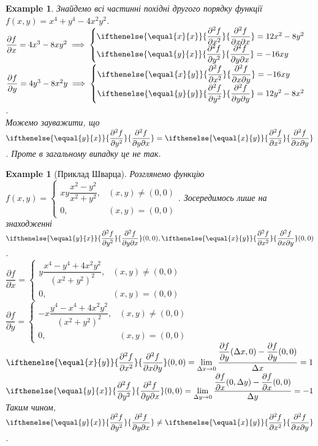 \documentclass[a4paper, 10pt]{article}
\def\departial#1#2{\dfrac{\partial {#1}}{\partial {#2}}}
\def\seconddepartial#1#2#3{\ifthenelse{\equal{#2}{#3}}{\dfrac{\partial^2 {#1}}{\partial {#2}^2}}{\dfrac{\partial^2 {#1}}{\partial {#2} \partial {#3}}}}
\def\huge{\displaystyle}
\theoremstyle{theoremdd}
\theoremstyle{theoremdd}
\theoremstyle{theoremdd}
\theoremstyle{theoremdd}
\theoremstyle{theoremdd}
\newtheorem{example}[theorem]{Example}
\theoremstyle{theoremdd}
\theoremstyle{theoremdd}
\theoremstyle{theoremdd}
\theoremstyle{theoremdd}
\begin{document}
\begin{example}
Знайдемо всі частинні похідні другого порядку функції $f(x,y) = x^4+y^4-4x^2y^2$.\\
$\departial{f}{x} = 4x^3 - 8xy^2 \implies \begin{cases} \seconddepartial{f}{x}{x} = 12x^2 - 8y^2 \\ \seconddepartial{f}{y}{x} = -16xy \end{cases}$ \hspace{1cm} $\departial{f}{y} = 4y^3 - 8x^2y \implies \begin{cases} \seconddepartial{f}{x}{y} = -16xy \\ \seconddepartial{f}{y}{y} = 12y^2-8x^2 \end{cases}$.\\
Можемо зауважити, що $\seconddepartial{f}{y}{x} = \seconddepartial{f}{x}{y}$. Проте в загальному випадку це не так.
\end{example}

\begin{example}[Приклад Шварца]
Розглянемо функцію $f(x,y) = \begin{cases} xy \dfrac{x^2-y^2}{x^2+y^2}, & (x,y) \neq (0,0) \\ 0, & (x,y) = (0,0) \end{cases}$. Зосередимось лише на знаходженні $\seconddepartial{f}{y}{x}(0,0), \seconddepartial{f}{x}{y}(0,0)$.\\
$\departial{f}{x} = \begin{cases} y\dfrac{x^4-y^4+4x^2y^2}{(x^2+y^2)^2}, & (x,y) \neq (0,0) \\ 0, & (x,y) = (0,0) \end{cases}$ \hspace{1cm} $\departial{f}{y} = \begin{cases} -x\dfrac{y^4-x^4+4x^2y^2}{(x^2+y^2)^2}, & (x,y) \neq (0,0) \\ 0, & (x,y) = (0,0) \end{cases}$\\
$\seconddepartial{f}{x}{y}(0,0) = \huge\lim_{\Delta x \to 0} \dfrac{\departial{f}{y}(\Delta x, 0) - \departial{f}{y}(0,0)}{\Delta x} = 1$ \hspace{1cm} $\seconddepartial{f}{y}{x}(0,0) = \huge\lim_{\Delta y \to 0} \dfrac{\departial{f}{x}(0, \Delta y) - \departial{f}{x}(0,0)}{\Delta y} = -1$\\
Таким чином, $\seconddepartial{f}{y}{x} \neq \seconddepartial{f}{x}{y}$.
\end{example}
\end{document}
